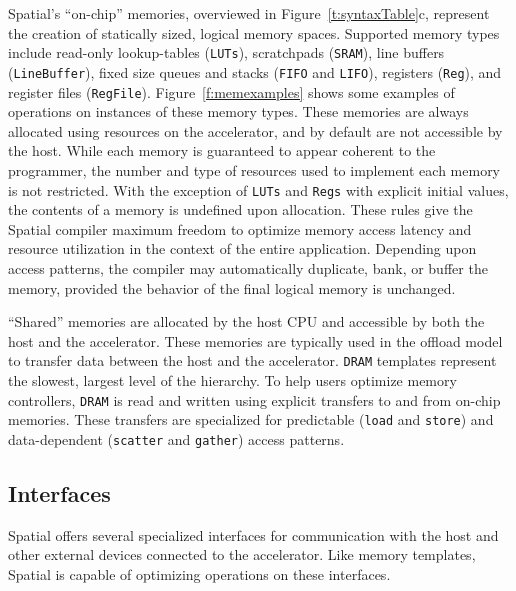 Spatial's ``on-chip'' memories, overviewed in Figure~\ref{t:syntaxTable}c, represent the creation of statically sized, logical memory spaces.
Supported memory types include read-only lookup-tables (\texttt{\small{LUTs}}), scratchpads (\texttt{\small{SRAM}}), line buffers (\texttt{\small{LineBuffer}}), fixed size queues and stacks (\texttt{\small{FIFO}} and \texttt{\small{LIFO}}),  registers (\texttt{\small{Reg}}), and register files (\texttt{\small{RegFile}}).
Figure~\ref{f:memexamples} shows some examples of operations on instances of these memory types.
These memories are always allocated using resources on the accelerator, and by default are not accessible by the host.
While each memory is guaranteed to appear coherent to the programmer, the number and type of resources used to implement each memory is not restricted.
With the exception of \texttt{\small{LUTs}} and \texttt{\small{Regs}} with explicit initial values, the contents of a memory is undefined upon allocation.
These rules give the Spatial compiler maximum freedom to optimize memory access latency and resource utilization in the context of the entire application.
Depending upon access patterns, the compiler may automatically duplicate, bank, or buffer the memory, provided the behavior of the final logical memory is unchanged.

``Shared'' memories are allocated by the host CPU and accessible by both the host and the accelerator.
These memories are typically used in the offload model to transfer data between the host and the accelerator.
\texttt{\small{DRAM}} templates represent the slowest, largest level of the hierarchy. To help users optimize
memory controllers, \texttt{\small{DRAM}} is read and written using explicit transfers to and from on-chip memories.
These transfers are specialized for predictable (\texttt{\small{load}} and \texttt{\small{store}}) and data-dependent
(\texttt{\small{scatter}} and \texttt{\small{gather}}) access patterns.


\subsection{Interfaces}
Spatial offers several specialized interfaces for communication with the host and other external devices connected to the accelerator. Like memory templates, Spatial is capable of optimizing operations on these interfaces.

